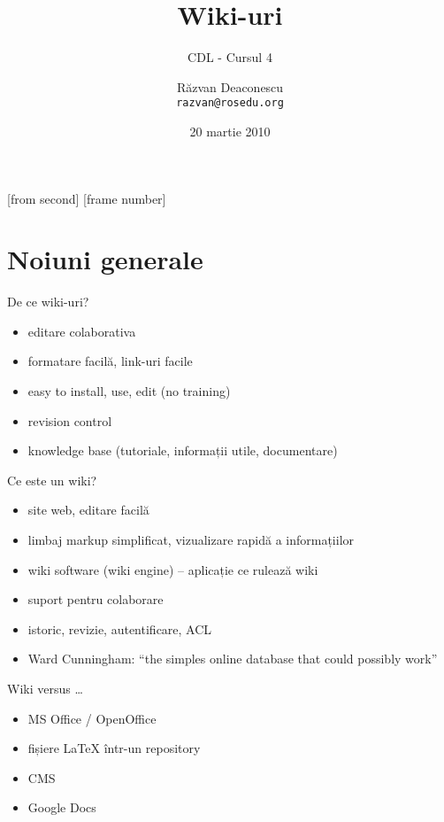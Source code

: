 \documentclass{beamer}
\title[Wiki-uri]{Wiki-uri}
\subtitle{CDL - Cursul 4}
\institute[ROSEdu]{ROSEdu}
\date{20 martie 2010}
\author{Răzvan Deaconescu \\ \texttt{razvan@rosedu.org}}
\begin{document}
[from second]
[frame number]

\frame{\titlepage}

\frame{\tableofcontents}


\section{Noiuni generale}

\frame{\tableofcontents[currentsection]}


\begin{frame}{De ce wiki-uri?}
  \begin{itemize}
    \item editare colaborativa
    \item formatare facilă, link-uri facile
    \item easy to install, use, edit (no training)
    \item revision control
    \item knowledge base (tutoriale, informații utile, documentare)
  \end{itemize}
\end{frame}

\begin{frame}{Ce este un wiki?}
  \begin{itemize}
    \item site web, editare facilă
    \item limbaj markup simplificat, vizualizare rapidă a informațiilor
    \item wiki software (wiki engine) -- aplicație ce rulează wiki
    \item suport pentru colaborare
    \item istoric, revizie, autentificare, ACL
    \item Ward Cunningham: ``the simples online database that could possibly
work''
  \end{itemize}
\end{frame}

\begin{frame}{Wiki versus \ldots}
  \begin{itemize}
    \item MS Office / OpenOffice
    \item fișiere LaTeX într-un repository
    \item CMS
    \item Google Docs
  \end{itemize}
\end{frame}
\end{document}
